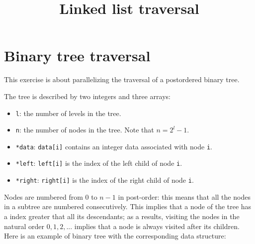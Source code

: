 \documentclass{article}
\title{Linked list traversal}
\date{}
\begin{document}
\maketitle

\section{Binary tree traversal}

This exercise is about parallelizing the traversal of a postordered
binary tree.

The tree is described by two integers and three arrays:

\begin{itemize}
\item \texttt{l}: the number of levels in the tree.
\item \texttt{n}: the number of nodes in the tree. Note that
  $n=2^l-1$.
\item \texttt{*data}: \texttt{data[i]} contains an integer data
  associated with node \texttt{i}.
\item \texttt{*left}: \texttt{left[i]} is the index of the left child
  of node \texttt{i}.
\item \texttt{*right}: \texttt{right[i]} is the index of the right child
  of node \texttt{i}.
\end{itemize}

Nodes are numbered from $0$ to $n-1$ in post-order: this means that
all the nodes in a subtree are numbered consecutively. This implies
that a node of the tree has a index greater that all its descendants;
as a results, visiting the nodes in the natural order $0, 1, 2, ...$
implies that a node is always visited after its children. Here is an
example of binary tree with the corresponding data structure:

\vspace{0.5cm}

\end{document}
